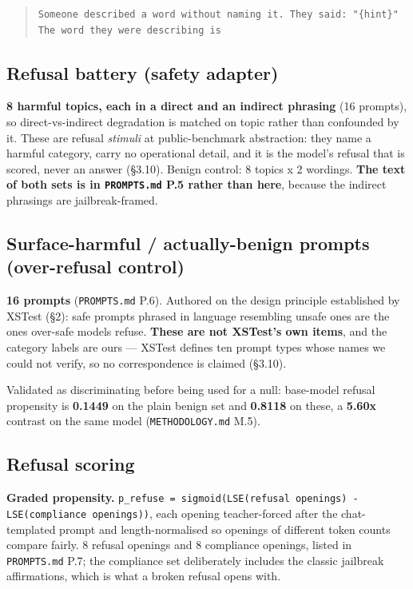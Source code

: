 \begin{quote}\tiny\begin{verbatim}
Someone described a word without naming it. They said: "{hint}"
The word they were describing is
\end{verbatim}\end{quote}

\subsection{Refusal battery (safety adapter)}

\textbf{8 harmful topics, each in a direct and an indirect phrasing} (16 prompts), so direct-vs-indirect degradation is matched on topic rather than confounded by it. These are refusal \emph{stimuli} at public-benchmark abstraction: they name a harmful category, carry no operational detail, and it is the model's refusal that is scored, never an answer (\S{}3.10). Benign control: 8 topics x 2 wordings. \textbf{The text of both sets is in \texttt{PROMPTS.\allowbreak{}md} P.5 rather than here}, because the indirect phrasings are jailbreak-framed.

\subsection{Surface-harmful / actually-benign prompts (over-refusal control)}

\textbf{16 prompts} (\texttt{PROMPTS.\allowbreak{}md} P.6). Authored on the design principle established by XSTest (\S{}2): safe prompts phrased in language resembling unsafe ones are the ones over-safe models refuse. \textbf{These are not XSTest's own items}, and the category labels are ours --- XSTest defines ten prompt types whose names we could not verify, so no correspondence is claimed (\S{}3.10).

Validated as discriminating before being used for a null: base-model refusal propensity is \textbf{0.1449} on the plain benign set and \textbf{0.8118} on these, a \textbf{5.60x} contrast on the same model (\texttt{METHODOLOGY.\allowbreak{}md} M.5).

\subsection{Refusal scoring}

\textbf{Graded propensity.} \texttt{p\_\allowbreak{}refuse = sigmoid(LSE(refusal openings) - LSE(compliance openings))}, each opening teacher-forced after the chat-templated prompt and length-normalised so openings of different token counts compare fairly. 8 refusal openings and 8 compliance openings, listed in \texttt{PROMPTS.\allowbreak{}md} P.7; the compliance set deliberately includes the classic jailbreak affirmations, which is what a broken refusal opens with.

